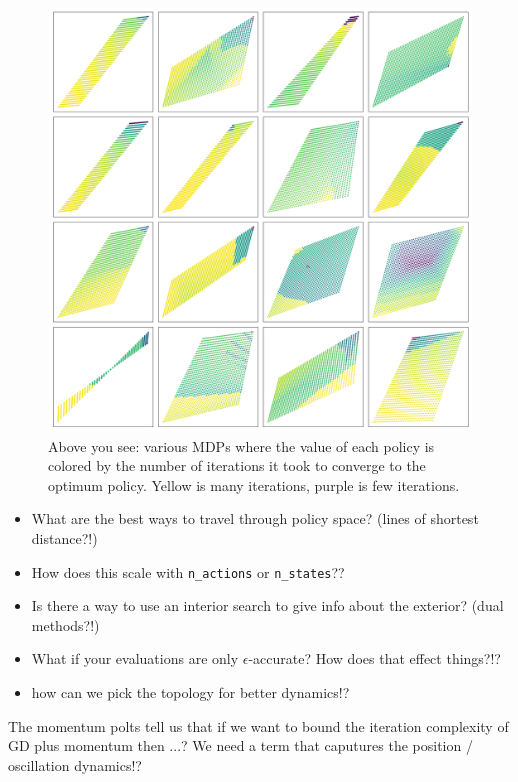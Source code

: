 \begin{figure}
\centering
\includegraphics[width=1\textwidth,height=1\textheight]{../../pictures/figures/mvi-iterations.png}
\caption{Above you see: various MDPs where the value of each policy is colored
by the number of iterations it took to converge to the optimum policy. Yellow is many iterations, purple is few iterations.}
\end{figure}

\begin{itemize}
\tightlist
\item
  What are the best ways to travel through policy space? (lines of
  shortest distance?!)
\item
  How does this scale with \texttt{n\_actions} or \texttt{n\_states}??
\item
  Is there a way to use an interior search to give info about the
  exterior? (dual methods?!)
\item
  What if your evaluations are only \(\epsilon\)-accurate? How does that
  effect things?!?
\item
  how can we pick the topology for better dynamics!?
\end{itemize}




The momentum polts tell us that if we want to bound the iteration complexity of GD plus momentum
then ...? We need a term that caputures the position / oscillation dynamics!?


